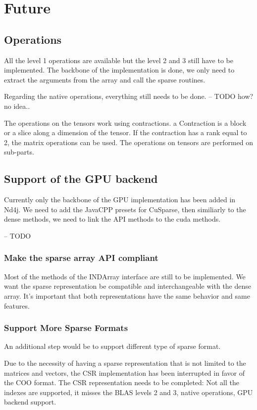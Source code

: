 \chapter{Future}

\section{Operations}

All the level 1 operations are available but the level 2 and 3 still have to be implemented. The backbone of the implementation is done, we only need to extract the arguments from the array and call the sparse routines.

Regarding the native operations, everything still needs to be done.
-- TODO how? no idea..

The operations on the tensors work using contractions. a Contraction is a block or a slice along a dimension of the tensor. If the contraction has a rank equal to 2, the matrix operations can be used. The operations on tensors are performed on sub-parts.

\section{Support of the GPU backend}

Currently only the backbone of the GPU implementation has been added in Nd4j. We need to add the JavaCPP presets for CuSparse, then similiarly to the dense methods, we need to link the API methods to the cuda methods.


-- TODO

\subsection{Make the sparse array API compliant}

Most of the methods of the INDArray interface are still to be implemented. We want the sparse representation be compatible and interchangeable with the dense array. It's important that both representations have the same behavior and same features.

\subsection{Support More Sparse Formats}

An additional step would be to support different type of sparse format. 

Due to the necessity of having a sparse representation that is not limited to the matrices and vectors, the CSR implementation has been interrupted in favor of the COO format. The CSR representation needs to be completed: Not all the indexes are supported, it misses the BLAS levels 2 and 3, native operations, GPU backend support. 

